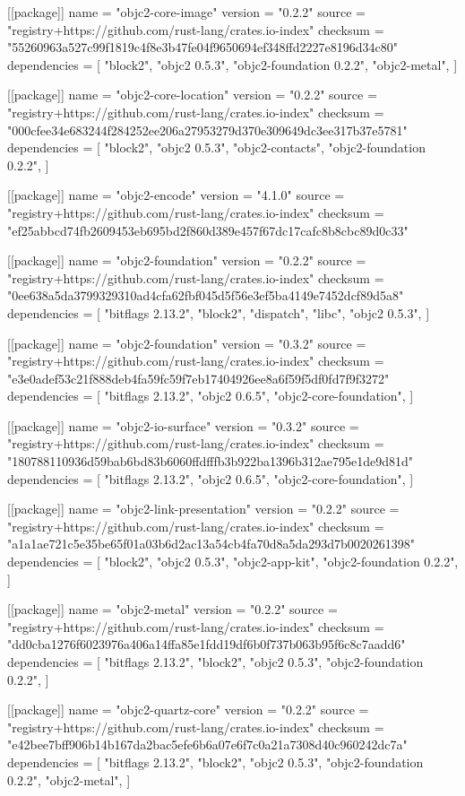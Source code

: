 [[package]]
name = "objc2-core-image"
version = "0.2.2"
source = "registry+https://github.com/rust-lang/crates.io-index"
checksum = "55260963a527c99f1819c4f8e3b47fe04f9650694ef348ffd2227e8196d34c80"
dependencies = [
 "block2",
 "objc2 0.5.3",
 "objc2-foundation 0.2.2",
 "objc2-metal",
]

[[package]]
name = "objc2-core-location"
version = "0.2.2"
source = "registry+https://github.com/rust-lang/crates.io-index"
checksum = "000cfee34e683244f284252ee206a27953279d370e309649dc3ee317b37e5781"
dependencies = [
 "block2",
 "objc2 0.5.3",
 "objc2-contacts",
 "objc2-foundation 0.2.2",
]

[[package]]
name = "objc2-encode"
version = "4.1.0"
source = "registry+https://github.com/rust-lang/crates.io-index"
checksum = "ef25abbcd74fb2609453eb695bd2f860d389e457f67dc17cafc8b8cbc89d0c33"

[[package]]
name = "objc2-foundation"
version = "0.2.2"
source = "registry+https://github.com/rust-lang/crates.io-index"
checksum = "0ee638a5da3799329310ad4cfa62fbf045d5f56e3ef5ba4149e7452dcf89d5a8"
dependencies = [
 "bitflags 2.13.2",
 "block2",
 "dispatch",
 "libc",
 "objc2 0.5.3",
]

[[package]]
name = "objc2-foundation"
version = "0.3.2"
source = "registry+https://github.com/rust-lang/crates.io-index"
checksum = "e3e0adef53c21f888deb4fa59fc59f7eb17404926ee8a6f59f5df0fd7f9f3272"
dependencies = [
 "bitflags 2.13.2",
 "objc2 0.6.5",
 "objc2-core-foundation",
]

[[package]]
name = "objc2-io-surface"
version = "0.3.2"
source = "registry+https://github.com/rust-lang/crates.io-index"
checksum = "180788110936d59bab6bd83b6060ffdfffb3b922ba1396b312ae795e1de9d81d"
dependencies = [
 "bitflags 2.13.2",
 "objc2 0.6.5",
 "objc2-core-foundation",
]

[[package]]
name = "objc2-link-presentation"
version = "0.2.2"
source = "registry+https://github.com/rust-lang/crates.io-index"
checksum = "a1a1ae721c5e35be65f01a03b6d2ac13a54cb4fa70d8a5da293d7b0020261398"
dependencies = [
 "block2",
 "objc2 0.5.3",
 "objc2-app-kit",
 "objc2-foundation 0.2.2",
]

[[package]]
name = "objc2-metal"
version = "0.2.2"
source = "registry+https://github.com/rust-lang/crates.io-index"
checksum = "dd0cba1276f6023976a406a14ffa85e1fdd19df6b0f737b063b95f6c8c7aadd6"
dependencies = [
 "bitflags 2.13.2",
 "block2",
 "objc2 0.5.3",
 "objc2-foundation 0.2.2",
]

[[package]]
name = "objc2-quartz-core"
version = "0.2.2"
source = "registry+https://github.com/rust-lang/crates.io-index"
checksum = "e42bee7bff906b14b167da2bac5efe6b6a07e6f7c0a21a7308d40c960242dc7a"
dependencies = [
 "bitflags 2.13.2",
 "block2",
 "objc2 0.5.3",
 "objc2-foundation 0.2.2",
 "objc2-metal",
]

